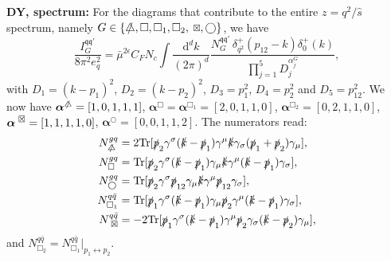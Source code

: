 \documentclass[%
 reprint,
 amsmath,amssymb,
 superscriptaddress,
 aps,
 preprintnumbers,
prl,
floatfix,
]{revtex4-2}
\DeclareRobustCommand{\timesbox}{%
  \mathbin{%
    \scalebox{0.8}{
    \ooalign{%
      $\Box$\cr
      \hfil\raisebox{0.2ex}{$\times$}\hfil\cr %
    }%
    }
  }%
}
\begin{document}
\textbf{DY, spectrum:} For the diagrams that contribute to the entire $z=q^2/\hat{s}$ spectrum, namely $G\in\{\slashed{\triangle},\allowbreak\Box,\allowbreak\Box_1,\allowbreak\Box_2,\allowbreak \timesbox,\allowbreak\bigcirc\}$, we have
\begin{equation}
\frac{I_{G}^{\mathfrak{q}\mathfrak{q}'}}{8\pi^2e_q^2 }=\bar{\mu}^{2\epsilon}C_FN_c\int \frac{\mathrm{d}^d k}{(2\pi)^d} \frac{N_{G}^{\mathfrak{q}\mathfrak{q}'} \, \delta_{q^2}^+(p_{12}-k)\delta^+_0(k)}{\prod_{j=1}^5 D_j^{\alpha_j^G}},
\end{equation}
with $D_1=(k-p_1)^2$, $D_2=(k-p_2)^2$, $D_3=p_1^2$, $D_4=p_2^2$ and $D_5=p_{12}^2$.
We now have $\boldsymbol{\alpha}^{\slashed{\triangle}}=[1,0,1,1,1]$, $\boldsymbol{\alpha}^{\Box}=\boldsymbol{\alpha}^{\Box_1}=[2,0,1,1,0]$, $\boldsymbol{\alpha}^{\Box_2}=[0,2,1,1,0]$, $\boldsymbol{\alpha}^{\timesbox}=[1,1,1,1,0]$, $\boldsymbol{\alpha}^{\bigcirc}=[0,0,1,1,2]$.
The numerators read:
\begin{align}
N^{gq}_{\slashed{\triangle}}&=2\text{Tr}[\slashed{p}_2\gamma^\sigma (\slashed{k}-\slashed{p}_1) \gamma^\mu \slashed{k}\gamma_\sigma (\slashed{p}_1+\slashed{p}_2)\gamma_\mu], \\
N^{gq}_{\Box}&=\text{Tr}[\slashed{p}_2\gamma^\sigma (\slashed{k}-\slashed{p}_1) \gamma_\mu \slashed{k}\gamma^\mu (\slashed{k}-\slashed{p}_1)\gamma_\sigma],\\
N^{gq}_{\bigcirc}&=\text{Tr}[\slashed{p}_2\gamma^\sigma \slashed{p}_{12} \gamma_\mu \slashed{k}\gamma^\mu \slashed{p}_{12}\gamma_\sigma],
\\
N^{q\bar{q}}_{\Box_1}&=\text{Tr}[\slashed{p}_1\gamma^\sigma (\slashed{k}-\slashed{p}_1) \gamma_\mu \slashed{p}_2\gamma^\mu (\slashed{k}-\slashed{p}_1)\gamma_\sigma],\\
N^{q\bar{q}}_{\timesbox}&=-2\text{Tr}[\slashed{p}_1\gamma^\sigma (\slashed{k}-\slashed{p}_1) \gamma^\mu \slashed{p}_2\gamma_\sigma (\slashed{k}-\slashed{p}_2)\gamma_\mu],
\end{align}
and $N_{\Box_2}^{q\bar{q}}=N_{\Box_1}^{q\bar{q}}|_{p_1\leftrightarrow p_2}$. 

\end{document}
